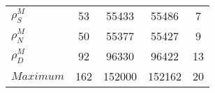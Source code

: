 \begin{center}
\begin{longtable}{lcccc}
$ {\rho^{M}_{S}}       $	 & 	                   53	 & 	                55433	 & 	                55486	 & 	                    7 \\ 
$ {\rho^{M}_{N}}       $	 & 	                   50	 & 	                55377	 & 	                55427	 & 	                    9 \\ 
$ {\rho^{M}_{D}}       $	 & 	                   92	 & 	                96330	 & 	                96422	 & 	                   13 \\ 
$Maximum               $	 & 	                  162	 & 	               152000	 & 	               152162	 & 	                   20 \\ 
\end{longtable}
 \end{center}
